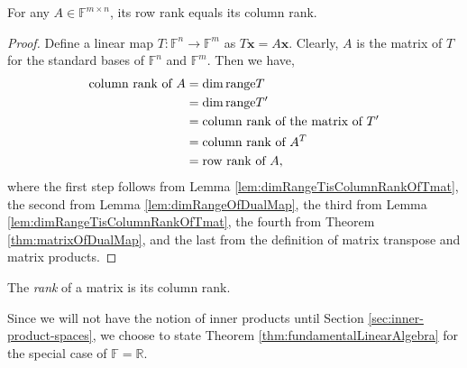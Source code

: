 \begin{thm}
  \label{thm:rowRankIsColRank}
  For any $A\in \mathbb{F}^{m\times n}$,
   its row rank equals its column rank.
\end{thm}
\begin{proof}
  Define a linear map
   $T: \mathbb{F}^{n}\rightarrow\mathbb{F}^{m}$ as
   $T \mathbf{x} = A \mathbf{x}$.
  Clearly, $A$ is the matrix of $T$
   for the standard bases of $\mathbb{F}^n$
   and $\mathbb{F}^m$.
  Then we have,
  \begin{align*}
    \text{column rank of } A 
    &= \dim \mathrm{range} T
    \\
    &= \dim \mathrm{range} T'
    \\
    &= \text{column rank of the matrix of } T'
    \\
    &=\text{column rank of } A^T
    \\
    &=\text{row rank of } A,
  \end{align*}
  where the first step follows
  from Lemma \ref{lem:dimRangeTisColumnRankOfTmat},
  the second from Lemma \ref{lem:dimRangeOfDualMap},
  the third from Lemma \ref{lem:dimRangeTisColumnRankOfTmat},
  the fourth from Theorem \ref{thm:matrixOfDualMap},
  and the last from the definition of 
  matrix transpose and matrix products.
\end{proof}

\begin{defn}
  \label{def:matrixRank}
  The \emph{rank} of a matrix is its column rank.
\end{defn}

\begin{rem}
  Since we will not have the notion of inner products
  until Section \ref{sec:inner-product-spaces}, 
  we choose to state Theorem \ref{thm:fundamentalLinearAlgebra}
  for the special case of $\mathbb{F}=\mathbb{R}$.
\end{rem}

